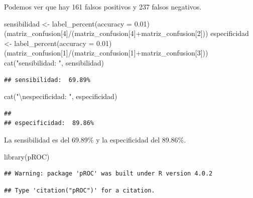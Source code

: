 \documentclass[
]{article}
\newenvironment{Shaded}{\begin{snugshade}}{\end{snugshade}}
\newcommand{\CharTok}[1]{\textcolor[rgb]{0.86,0.64,0.64}{#1}}
\newcommand{\DataTypeTok}[1]{\textcolor[rgb]{0.87,0.87,0.75}{#1}}
\newcommand{\DecValTok}[1]{\textcolor[rgb]{0.86,0.86,0.80}{#1}}
\newcommand{\FloatTok}[1]{\textcolor[rgb]{0.75,0.75,0.82}{#1}}
\newcommand{\KeywordTok}[1]{\textcolor[rgb]{0.94,0.87,0.69}{#1}}
\newcommand{\NormalTok}[1]{\textcolor[rgb]{0.80,0.80,0.80}{#1}}
\newcommand{\OperatorTok}[1]{\textcolor[rgb]{0.94,0.94,0.82}{#1}}
\newcommand{\StringTok}[1]{\textcolor[rgb]{0.80,0.58,0.58}{#1}}
\begin{document}
Podemos ver que hay 161 falsos positivos y 237 falsos negativos.

\begin{Shaded}
\begin{Highlighting}[]
\NormalTok{sensibilidad \textless{}{-}}\StringTok{ }\KeywordTok{label\_percent}\NormalTok{(}\DataTypeTok{accuracy =} \FloatTok{0.01}\NormalTok{)(matriz\_confusion[}\DecValTok{4}\NormalTok{]}\OperatorTok{/}\NormalTok{(matriz\_confusion[}\DecValTok{4}\NormalTok{]}\OperatorTok{+}\NormalTok{matriz\_confusion[}\DecValTok{2}\NormalTok{]))}
\NormalTok{especificidad \textless{}{-}}\StringTok{ }\KeywordTok{label\_percent}\NormalTok{(}\DataTypeTok{accuracy =} \FloatTok{0.01}\NormalTok{)(matriz\_confusion[}\DecValTok{1}\NormalTok{]}\OperatorTok{/}\NormalTok{(matriz\_confusion[}\DecValTok{1}\NormalTok{]}\OperatorTok{+}\NormalTok{matriz\_confusion[}\DecValTok{3}\NormalTok{]))}
\KeywordTok{cat}\NormalTok{(}\StringTok{"sensibilidad: "}\NormalTok{,  sensibilidad)}
\end{Highlighting}
\end{Shaded}

\begin{verbatim}
## sensibilidad:  69.89%
\end{verbatim}

\begin{Shaded}
\begin{Highlighting}[]
\KeywordTok{cat}\NormalTok{(}\StringTok{"}\CharTok{\textbackslash{}n}\StringTok{especificidad: "}\NormalTok{, especificidad)}
\end{Highlighting}
\end{Shaded}

\begin{verbatim}
## 
## especificidad:  89.86%
\end{verbatim}

La sensibilidad es del 69.89\% y la especificidad del 89.86\%.

\begin{Shaded}
\begin{Highlighting}[]
\KeywordTok{library}\NormalTok{(pROC)}
\end{Highlighting}
\end{Shaded}

\begin{verbatim}
## Warning: package 'pROC' was built under R version 4.0.2
\end{verbatim}

\begin{verbatim}
## Type 'citation("pROC")' for a citation.
\end{verbatim}
\end{document}
